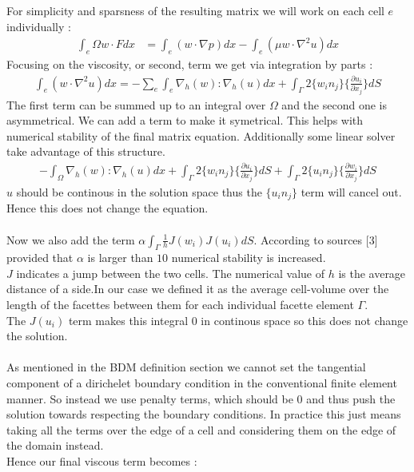 \documentclass[11pt,twoside,a4paper]{article}
\begin{document}
For simplicity and sparsness of the resulting matrix we will work on each cell $e$ individually : 
\begin{align*}
\int_e\Omega w \cdot F dx &= \int_e (w \cdot \nabla p) dx - \int_e (\mu w \cdot \nabla^2 u) dx
\end{align*}
Focusing on the viscosity, or second, term we get via integration by parts :
\begin{align*}
\int_e (w \cdot \nabla^2 u) dx = - \sum_e \int_e \nabla_h(w) : \nabla_h(u) dx + \int_\Gamma 2 \{ w_i n_j \} \{ \frac{\partial u_i}{\partial x_j}\} dS
\end{align*}
The first term can be summed up to an integral over $\Omega$ and the second one is asymmetrical. We can add a term to make it symetrical. This helps with numerical stability of the final matrix equation. Additionally some linear solver take advantage of this structure.
\begin{align*}
-  \int_\Omega \nabla_h(w) : \nabla_h(u) dx + \int_\Gamma 2 \{ w_i n_j \} \{ \frac{\partial u_i}{\partial x_j}\} dS + \int_\Gamma 2 \{ u_i n_j \} \{ \frac{\partial w_i}{\partial x_j}\} dS
\end{align*}
$u$ should be continous in the solution space thus the $ \{ u_i n_j \}$ term will cancel out. Hence this does not change the equation.\\
\\
Now we also add the term $\alpha \int_\Gamma \frac{1}{h}  J(w_i) J(u_i) dS$. According to sources [3] provided that  $\alpha$ is larger than $10$ numerical stability is increased.\\
$J$ indicates a jump between the two cells. The numerical value of $h$ is the average distance of a side.In our case we defined it as the average cell-volume over the length of the facettes between them for each individual facette element $\Gamma$.\\
The $J(u_i)$ term makes this integral $0$ in continous space so this does not change the solution.\\
\\
As mentioned in the BDM definition section we cannot set the tangential component of a dirichelet boundary condition in the conventional finite element manner.  So instead we use penalty terms, which should be $0$ and thus push the solution towards respecting the boundary conditions. In practice this just means taking all the terms over the edge of a cell and considering them on the edge of the domain instead.\\
 Hence our final viscous term becomes :\\
\end{document}
